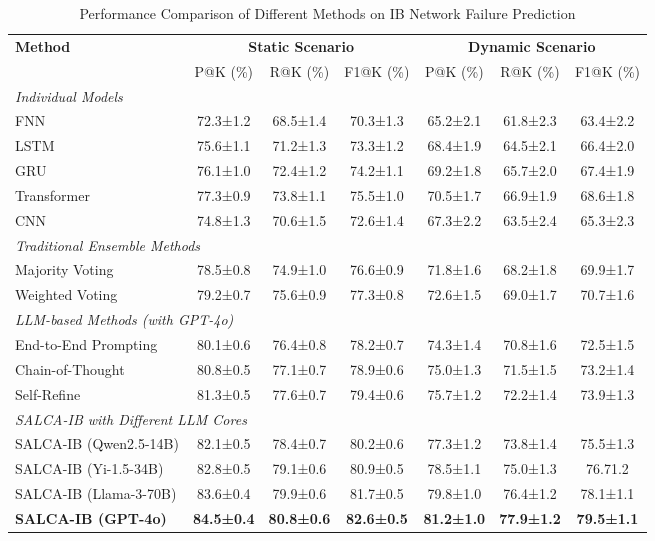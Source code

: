 \documentclass[conference]{IEEEtran}
\begin{document}
\begin{table}[!t]
\caption{Performance Comparison of Different Methods on IB Network Failure Prediction}
\label{tab:main_results}
\renewcommand{\arraystretch}{1.2}
\centering
\begin{tabular}{l|ccc|ccc}
\hline
\multirow{2}{*}{\textbf{Method}} & \multicolumn{3}{c|}{\textbf{Static Scenario}} & \multicolumn{3}{c}{\textbf{Dynamic Scenario}} \\
\cline{2-7}
& P@K (\%) & R@K (\%) & F1@K (\%) & P@K (\%) & R@K (\%) & F1@K (\%) \\
\hline
\multicolumn{7}{l}{\textit{Individual Models}} \\
\hline
FNN & 72.3±1.2 & 68.5±1.4 & 70.3±1.3 & 65.2±2.1 & 61.8±2.3 & 63.4±2.2 \\
LSTM & 75.6±1.1 & 71.2±1.3 & 73.3±1.2 & 68.4±1.9 & 64.5±2.1 & 66.4±2.0 \\
GRU & 76.1±1.0 & 72.4±1.2 & 74.2±1.1 & 69.2±1.8 & 65.7±2.0 & 67.4±1.9 \\
Transformer & 77.3±0.9 & 73.8±1.1 & 75.5±1.0 & 70.5±1.7 & 66.9±1.9 & 68.6±1.8 \\
CNN & 74.8±1.3 & 70.6±1.5 & 72.6±1.4 & 67.3±2.2 & 63.5±2.4 & 65.3±2.3 \\
\hline
\multicolumn{7}{l}{\textit{Traditional Ensemble Methods}} \\
\hline
Majority Voting & 78.5±0.8 & 74.9±1.0 & 76.6±0.9 & 71.8±1.6 & 68.2±1.8 & 69.9±1.7 \\
Weighted Voting & 79.2±0.7 & 75.6±0.9 & 77.3±0.8 & 72.6±1.5 & 69.0±1.7 & 70.7±1.6 \\
\hline
\multicolumn{7}{l}{\textit{LLM-based Methods (with GPT-4o)}} \\
\hline
End-to-End Prompting & 80.1±0.6 & 76.4±0.8 & 78.2±0.7 & 74.3±1.4 & 70.8±1.6 & 72.5±1.5 \\
Chain-of-Thought & 80.8±0.5 & 77.1±0.7 & 78.9±0.6 & 75.0±1.3 & 71.5±1.5 & 73.2±1.4 \\
Self-Refine & 81.3±0.5 & 77.6±0.7 & 79.4±0.6 & 75.7±1.2 & 72.2±1.4 & 73.9±1.3 \\
\hline
\multicolumn{7}{l}{\textit{SALCA-IB with Different LLM Cores}} \\
\hline
SALCA-IB (Qwen2.5-14B) & 82.1±0.5 & 78.4±0.7 & 80.2±0.6 & 77.3±1.2 & 73.8±1.4 & 75.5±1.3 \\
SALCA-IB (Yi-1.5-34B) & 82.8±0.5 & 79.1±0.6 & 80.9±0.5 & 78.5±1.1 & 75.0±1.3 & 76.71.2 \\
SALCA-IB (Llama-3-70B) & 83.6±0.4 & 79.9±0.6 & 81.7±0.5 & 79.8±1.0 & 76.4±1.2 & 78.1±1.1 \\
\textbf{SALCA-IB (GPT-4o)} & \textbf{84.5±0.4} & \textbf{80.8±0.6} & \textbf{82.6±0.5} & \textbf{81.2±1.0} & \textbf{77.9±1.2} & \textbf{79.5±1.1} \\
\hline
\end{tabular}
\end{table}
\end{document}
